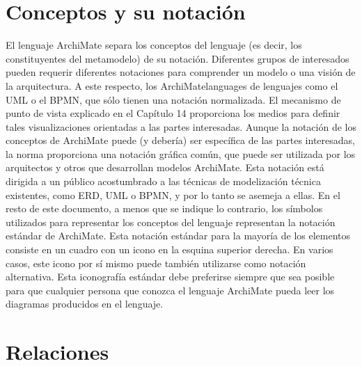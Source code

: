 \section{Conceptos y su notación}
El lenguaje ArchiMate separa los conceptos del lenguaje (es decir, los constituyentes del metamodelo) de su notación. Diferentes grupos de interesados pueden requerir diferentes notaciones para comprender un modelo o una visión de la arquitectura.  A este respecto, los ArchiMatelanguages de lenguajes como el UML o el BPMN, que sólo tienen una notación normalizada. El mecanismo de punto de vista explicado en el Capítulo 14 proporciona los medios para definir tales visualizaciones orientadas a las partes interesadas. Aunque la notación de los conceptos de ArchiMate puede (y debería) ser específica de las partes interesadas, la norma proporciona una notación gráfica común, que puede ser utilizada por los arquitectos y otros que desarrollan modelos ArchiMate. Esta notación está dirigida a un público acostumbrado a las técnicas de modelización técnica existentes, como ERD, UML o BPMN, y por lo tanto se asemeja a ellas. En el resto de este documento, a menos que se indique lo contrario, los símbolos utilizados para representar los conceptos del lenguaje representan la notación estándar de ArchiMate.  Esta notación estándar para la mayoría de los elementos consiste en un cuadro con un icono en la esquina superior derecha. En varios casos, este icono por sí mismo puede también utilizarse como notación alternativa. Esta iconografía estándar debe preferirse siempre que sea posible para que cualquier persona que conozca el lenguaje ArchiMate pueda leer los diagramas producidos en el lenguaje.















\section{Relaciones}

